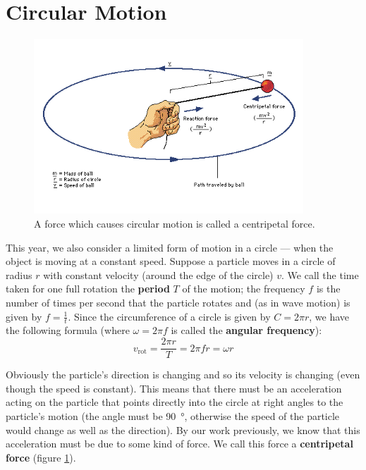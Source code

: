 \documentclass[a4paper]{amsbook}
\newcommand\capcite[1]{}
\begin{document}
\section{Circular Motion}
\begin{figure}
  \centering
  \includegraphics[width=0.9\textwidth]{centripetal}
  \caption{A force which causes circular motion is called a centripetal force. \capcite{https://i.pinimg.com/originals/74/d2/28/74d228e85a6a3f4fb700bcafa677539d.gif}\label{fig:centripetal}}
\end{figure}
This year, we also consider a limited form of motion in a circle --- when the object is moving at a constant speed. Suppose
a particle moves in a circle of radius $ r $ with constant velocity (around the edge of the circle) $ v $. We call the time
taken for one full rotation the \textbf{period} $ T $ of the motion; the frequency $ f $ is the number of times per second
that the particle rotates and (as in wave motion) is given by $ f = \frac{1}{t} $. Since the circumference of a circle is
given by $ C = 2\pi r $, we have the following formula (where $ \omega = 2\pi f $ is called the \textbf{angular frequency}):
\begin{equation}
  v_{\text{rot}} = \frac{2\pi r}{T} = 2\pi f r = \omega r
\end{equation}

Obviously the particle's direction is changing and so its velocity is changing (even though the speed is constant). This means
that there must be an acceleration acting on the particle that points directly into the circle at right angles to the particle's
motion (the angle must be \SI{90}{\degree}, otherwise the speed of the particle would change as well as the direction). By
our work previously, we know that this acceleration must be due to some kind of force. We call this force a \textbf{centripetal
force} (figure \ref{fig:centripetal}).
\end{document}
